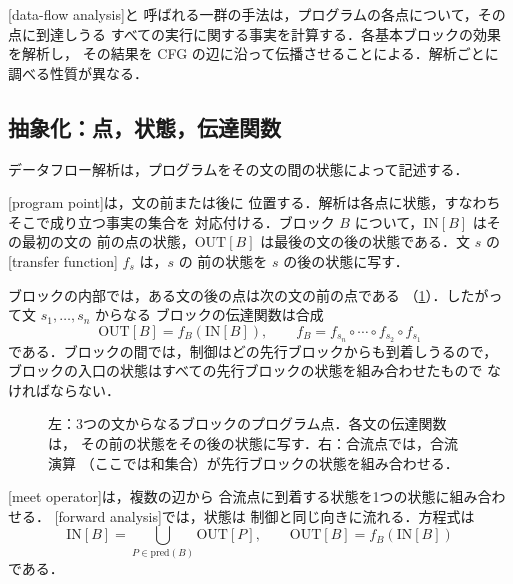 \documentclass[../main.tex]{subfiles}
\begin{document}
\begin{definition}[データフロー解析]
  [data-flow analysis]と
  呼ばれる一群の手法は，プログラムの各点について，その点に到達しうる
  すべての実行に関する事実を計算する．各基本ブロックの効果を解析し，
  その結果を CFG の辺に沿って伝播させることによる．解析ごとに
  調べる性質が異なる．
\end{definition}

\subsection{抽象化：点，状態，伝達関数}

データフロー解析は，プログラムをその文の間の状態によって記述する．

\begin{definition}
  [program point]は，文の前または後に
  位置する．解析は各点に状態，すなわちそこで成り立つ事実の集合を
  対応付ける．ブロック $B$ について，$\mathrm{IN}[B]$ はその最初の文の
  前の点の状態，$\mathrm{OUT}[B]$ は最後の文の後の状態である．文 $s$ の
  [transfer function] $f_s$ は，$s$ の
  前の状態を $s$ の後の状態に写す．
\end{definition}

ブロックの内部では，ある文の後の点は次の文の前の点である
（\cref{fig:l10-transfer}）．したがって文 $s_1,\dots,s_n$ からなる
ブロックの伝達関数は合成
\begin{equation}
  \label{eq:l10-compose}
  \mathrm{OUT}[B] = f_B(\mathrm{IN}[B]),\qquad
  f_B = f_{s_n}\circ\cdots\circ f_{s_2}\circ f_{s_1}
\end{equation}
である．ブロックの間では，制御はどの先行ブロックからも到着しうるので，
ブロックの入口の状態はすべての先行ブロックの状態を組み合わせたもので
なければならない．

\begin{figure}[tb]
  \centering
  
  \caption{左：3つの文からなるブロックのプログラム点．各文の伝達関数は，
    その前の状態をその後の状態に写す．右：合流点では，合流演算
    （ここでは和集合）が先行ブロックの状態を組み合わせる．}
  \label{fig:l10-transfer}
\end{figure}

\begin{definition}
  [meet operator]は，複数の辺から
  合流点に到着する状態を1つの状態に組み合わせる．
  [forward analysis]では，状態は
  制御と同じ向きに流れる．方程式は
  \begin{equation}
    \label{eq:l10-forward}
    \mathrm{IN}[B] = \bigcup_{P\in\mathrm{pred}(B)}\mathrm{OUT}[P],\qquad
    \mathrm{OUT}[B] = f_B(\mathrm{IN}[B])
  \end{equation}
  である．
\end{definition}
\end{document}

